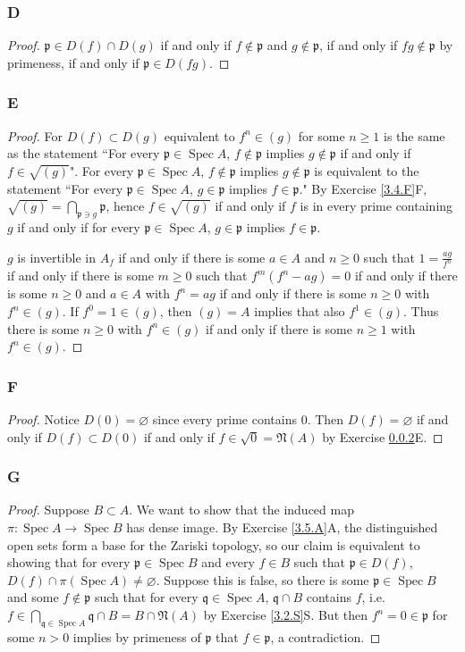 \documentclass{article}
\newcommand{\frkp}{\mathfrak{p}}
\newcommand{\frkq}{\mathfrak{q}}
\newcommand{\frkN}{\mathfrak{N}}
\DeclareMathOperator{\Spec}{\mathrm{Spec}}
\let\emptyset\varnothing
\theoremstyle{definition} %
\begin{document}
\subsubsection{D}\label{3.5.D}
\begin{proof}
    $\frkp \in D(f)\cap D(g)$ if and only if $f\notin \frkp$ and $g\notin \frkp$, if and only if $fg\notin \frkp$ by primeness, if and only if $\frkp \in D(fg)$.
\end{proof}
\subsubsection{E}\label{3.5.E}
\begin{proof}
    For $D(f)\subset D(g)$ equivalent to $f^n \in (g)$ for some $n\ge 1$ is the same as the statement ``For every $\frkp \in \Spec A$, $f\notin \frkp$ implies $g\notin \frkp$ if and only if $f\in \sqrt{(g)}$". For every $\frkp \in \Spec A$, $f\notin \frkp$ implies $g\notin \frkp$ is equivalent to the statement ``For every $\frkp \in \Spec A$, $g\in \frkp$ implies $f\in \frkp$." By Exercise \ref{3.4.F}F, $\sqrt {(g)} = \bigcap_{\frkp \ni g} \frkp$, hence $f\in \sqrt{(g)}$ if and only if $f$ is in every prime containing $g$ if and only if for every $\frkp \in \Spec A$, $g\in \frkp $ implies $f\in \frkp$.

     $g$ is invertible in $A_f$ if and only if there is some $a\in A$ and $n\ge 0$ such that $1 = \frac{ag}{f^n}$ if and only if there is some $m\ge 0$ such that $f^m(f^n-ag)=0$ if and only if there is some $n\ge 0$ and $a\in A$ with $f^n = ag$ if and only if there is some $n\ge 0$ with $f^n \in (g)$. If $f^0=1 \in (g)$, then $(g)=A$ implies that also $f^1 \in (g)$. Thus there is some $n\ge 0$ with $f^n\in (g)$ if and only if there is some $n\ge 1$ with $f^n \in (g)$.
\end{proof}
\subsubsection{F}\label{3.5.F}
\begin{proof}
    Notice $D(0)=\emptyset$ since every prime contains $0$. Then $D(f)=\emptyset$ if and only if $D(f)\subset D(0)$ if and only if $f\in \sqrt{0}=\frkN(A)$ by Exercise \ref{3.5.E}E.
\end{proof}
\subsubsection{G}\label{3.5.G}
\begin{proof}
    Suppose $B \subset A$. We want to show that the induced map $\pi:\Spec A \to \Spec B$ has dense image. By Exercise \ref{3.5.A}A, the distinguished open sets form a base for the Zariski topology, so our claim is equivalent to showing that for every $\frkp \in \Spec B$ and every $f\in B$ such that $\frkp \in D(f)$, $D(f)\cap \pi(\Spec A) \ne \emptyset$. Suppose this is false, so there is some $\frkp \in \Spec B$ and some $f\notin \frkp$ such that for every $\frkq \in \Spec A$, $\frkq \cap B$ contains $f$, i.e. $f\in \bigcap_{\frkq \in \Spec A} \frkq \cap B = B\cap \frkN(A)$ by Exercise \ref{3.2.S}S. But then $f^n=0 \in \frkp$ for some $n>0$ implies by primeness of $\frkp$ that $f\in \frkp$, a contradiction.
\end{proof}
\end{document}

